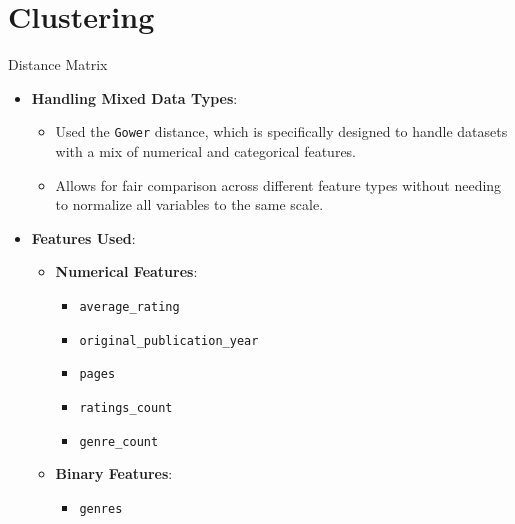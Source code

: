 \documentclass{beamer}
\begin{document}
\section{Clustering}
\begin{frame}{Distance Matrix}
    \begin{itemize}
        \item \textbf{Handling Mixed Data Types}: 
            \begin{itemize}
                \item Used the \texttt{Gower} distance, which is specifically designed to handle datasets with a mix of numerical and categorical features.
                \item Allows for fair comparison across different feature types without needing to normalize all variables to the same scale.
            \end{itemize}
        \item \textbf{Features Used}:
            \begin{itemize}
                \item \textbf{Numerical Features}:
                    \begin{itemize}
                        \item \texttt{average\_rating}
                        \item \texttt{original\_publication\_year}
                        \item \texttt{pages}
                        \item \texttt{ratings\_count}
                        \item \texttt{genre\_count}
                    \end{itemize}
                \item \textbf{Binary Features}:
                    \begin{itemize}
                        \item \texttt{genres}
                    \end{itemize}
            \end{itemize}
    \end{itemize}
\end{frame}
\end{document}
